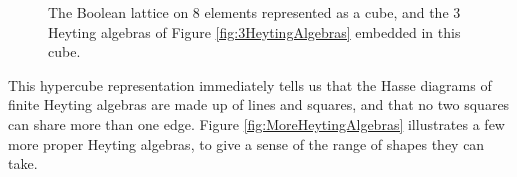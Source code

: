\begin{figure}[htbp]
\caption{The Boolean lattice on 8 elements represented as a cube, and the 3 Heyting algebras of Figure \ref{fig:3HeytingAlgebras} embedded in this cube.}\label{fig:HAlgsInCubes}
\end{figure}

This hypercube representation immediately tells us that the Hasse diagrams of finite Heyting algebras are made up of lines and squares, and that no two squares can share more than one edge.  Figure \ref{fig:MoreHeytingAlgebras} illustrates a few more proper Heyting algebras, to give a sense of the range of shapes they can take.

